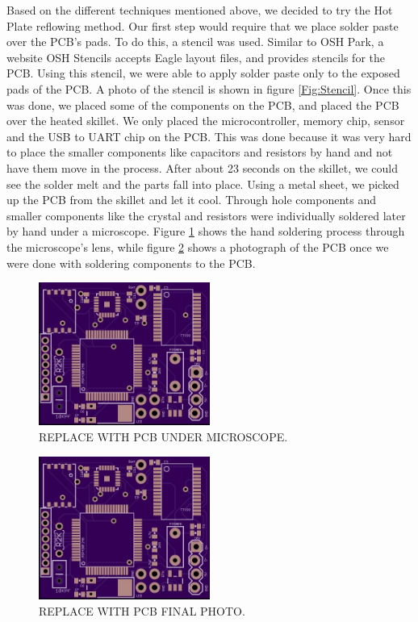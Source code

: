 Based on the different techniques mentioned above,
we decided to try the Hot Plate reflowing method.
Our first step would require that we place solder paste over the PCB's pads.
To do this,
a stencil was used.
Similar to OSH Park, a website OSH Stencils accepts Eagle layout files,
and provides stencils for the PCB.
Using this stencil,
we were able to apply solder paste only to the exposed pads of the PCB.
A photo of the stencil is shown in figure \ref{Fig:Stencil}.
Once this was done,
we placed some of the components on the PCB,
and placed the PCB over the heated skillet.
We only placed the microcontroller, memory chip, sensor and the USB to UART chip on the PCB.
This was done because it was very hard to place the smaller components like capacitors and resistors by hand and not have them move in the process.
After about 23 seconds on the skillet,
we could see the solder melt and the parts fall into place.
Using a metal sheet,
we picked up the PCB from the skillet and let it cool.
Through hole components and smaller components like the crystal and resistors were individually soldered later by hand under a microscope.
Figure \ref{Fig:PCBMicro} shows the hand soldering process through the microscope's lens, while figure \ref{Fig:FinalPCB} shows a photograph of the PCB once we were done with soldering components to the PCB.
\begin{figure}
\begin{center}
\includegraphics[width=0.5\textwidth]{images/PCBBare.jpg}
\caption{REPLACE WITH PCB UNDER MICROSCOPE.}
\label{Fig:PCBMicro}
\end{center}
\end{figure}
\begin{figure}
\begin{center}
\includegraphics[width=0.5\textwidth]{images/PCBBare.jpg}
\caption{REPLACE WITH PCB FINAL PHOTO.}
\label{Fig:FinalPCB}
\end{center}
\end{figure}

